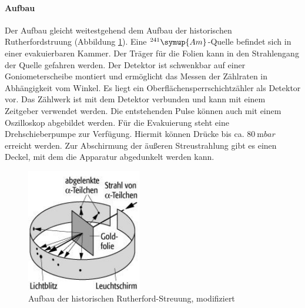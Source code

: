 \paragraph{Aufbau}
Der Aufbau gleicht weitestgehend dem Aufbau der historischen Rutherfordstruung (Abbildung \ref{fig:aufbau}).
Eine $^{241}\symup{Am}$-Quelle befindet sich in einer evakuierbaren Kammer.
Der Träger für die Folien kann in den Strahlengang der Quelle gefahren werden.
Der Detektor ist schwenkbar auf einer Goniometerscheibe montiert und ermöglicht das Messen der Zählraten in Abhängigkeit vom Winkel.
Es liegt ein Oberflächensperrschichtzähler als Detektor vor.
Das Zählwerk ist mit dem Detektor verbunden und kann mit einem Zeitgeber verwendet werden.
Die entstehenden Pulse können auch mit einem Oszilloskop abgebildet werden.
Für die Evakuierung steht eine Drehschieberpumpe zur Verfügung.
Hiermit können Drücke bis ca. $\SI{80}{\milli bar}$ erreicht werden.
Zur Abschirmung der äußeren Streustrahlung gibt es einen Deckel, mit dem die Apparatur abgedunkelt werden kann.

\begin{figure}[h!]
  \centering
  \includegraphics[width=5cm]{images/aufbau_rutherfordstreuung.jpg}
  \caption{Aufbau der historischen Rutherford-Streuung, modifiziert \cite{aufbau}}
  \label{fig:aufbau}
\end{figure}

\FloatBarrier

